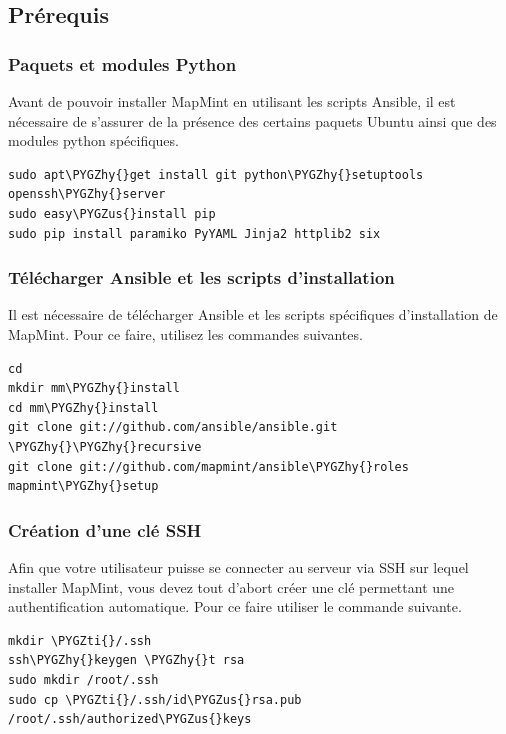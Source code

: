\documentclass[letterpaper,10pt,french]{sphinxmanual}
\def\PYGZus{\char`\_}
\def\PYGZhy{\char`\-}
\def\PYGZti{\char`\~}
\begin{document}
\subsection{Prérequis}
\label{introduction/installmapmint:prerequis}

\subsubsection{Paquets et modules Python}
\label{introduction/installmapmint:paquets-et-modules-python}
Avant de pouvoir installer MapMint en utilisant les scripts Ansible, il
est nécessaire de s'assurer de la présence des certains paquets
Ubuntu ainsi que des modules python spécifiques.

\begin{Verbatim}[commandchars=\\\{\}]
sudo apt\PYGZhy{}get install git python\PYGZhy{}setuptools openssh\PYGZhy{}server
sudo easy\PYGZus{}install pip
sudo pip install paramiko PyYAML Jinja2 httplib2 six
\end{Verbatim}


\subsubsection{Télécharger Ansible et les scripts d'installation}
\label{introduction/installmapmint:telecharger-ansible-et-les-scripts-d-installation}
Il est nécessaire de télécharger Ansible et les scripts spécifiques
d'installation de MapMint. Pour ce faire, utilisez les commandes
suivantes.

\begin{Verbatim}[commandchars=\\\{\}]
cd
mkdir mm\PYGZhy{}install
cd mm\PYGZhy{}install
git clone git://github.com/ansible/ansible.git \PYGZhy{}\PYGZhy{}recursive
git clone git://github.com/mapmint/ansible\PYGZhy{}roles mapmint\PYGZhy{}setup
\end{Verbatim}


\subsubsection{Création d'une clé SSH}
\label{introduction/installmapmint:creation-d-une-cle-ssh}
Afin que votre utilisateur puisse se connecter au serveur via SSH sur
lequel installer MapMint, vous devez tout d'abort créer une clé
permettant une authentification automatique. Pour ce faire utiliser
le commande suivante.

\begin{Verbatim}[commandchars=\\\{\}]
mkdir \PYGZti{}/.ssh
ssh\PYGZhy{}keygen \PYGZhy{}t rsa
sudo mkdir /root/.ssh
sudo cp \PYGZti{}/.ssh/id\PYGZus{}rsa.pub /root/.ssh/authorized\PYGZus{}keys
\end{Verbatim}
\end{document}

